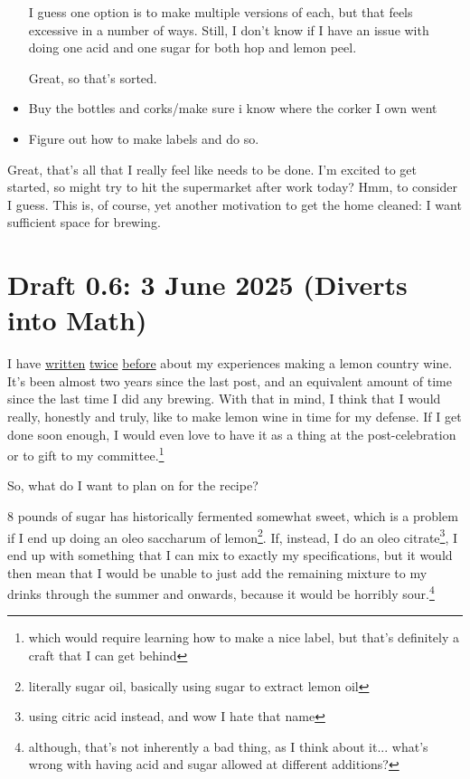 \documentclass[12pt]{article}
\renewcommand{\,}{\textsuperscript{,}}
\begin{document}
\begin{itemize}
I guess one option is to make multiple versions of each, but that feels excessive in a number of ways.  
Still, I don't know if I have an issue with doing one acid and one sugar for both hop and lemon peel.

Great, so that's sorted.

\item Buy the bottles and corks/make sure i know where the corker I own went

\item Figure out how to make labels and do so.

\end{itemize}

Great, that's all that I really feel like needs to be done. I'm excited to get started, so might try to hit the supermarket after work today? Hmm, to consider I guess.  
This is, of course, yet another motivation to get the home cleaned: I want sufficient space for brewing.

\section{Draft 0.6: 3 June 2025 (Diverts into Math)}

I have \href{lemon-wine}{written} \href{lemon-wine-2}{twice} \href{lemon-wine-3}{before} about my experiences making a lemon country wine.  
It's been almost two years since the last post, and an equivalent amount of time since the last time I did any brewing.  
With that in mind, I think that I would really, honestly and truly, like to make lemon wine in time for my defense.  
If I get done soon enough, I would even love to have it as a thing at the post-celebration or to gift to my committee.\footnote{which would require learning how to make a nice label, but that's definitely a craft that I can get behind}

So, what do I want to plan on for the recipe?

8 pounds of sugar has historically fermented somewhat sweet, which is a problem if I end up doing an oleo saccharum of lemon\footnote{literally sugar oil, basically using sugar to extract lemon oil}.  
If, instead, I do an oleo citrate\footnote{using citric acid instead, and wow I hate that name}, I end up with something that I can mix to exactly my specifications, but it would then mean that I would be unable to just add the remaining mixture to my drinks through the summer and onwards, because it would be horribly sour.\footnote{although, that's not inherently a bad thing, as I think about it... what's wrong with having acid and sugar allowed at different additions?}
\end{document}
